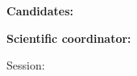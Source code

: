 \begin{titlepage}
\thispagestyle{titlepagestyle}
    \begin{center}
        \vspace*{\fill}
        \textbf{\fontsize{20pt}{30pt} \selectfont \MakeUppercase{\thesisTitle}}
    \end{center}
    
    \vspace*{\fill}
     
            
    \textbf{\fontsize{14pt}{16pt} \selectfont Candidates: \candidateName}
    
    \vspace{14pt}
    
    \textbf{\fontsize{14pt}{16pt} \selectfont Scientific coordinator: \coordinator}

    \begin{center}
        \vspace{50pt}
        \fontsize{14pt}{16pt} \selectfont Session: \monthOfPresentation{} \academicYear 
    \end{center}
    

\end{titlepage}